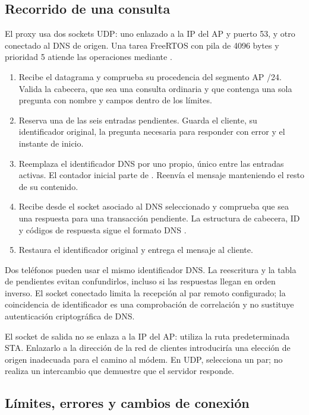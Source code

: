 \documentclass[11pt,a4paper]{article}
\newcommand{\code}[1]{\texttt{\detokenize{#1}}}
\begin{document}
\subsection{Recorrido de una consulta}

El proxy usa dos sockets UDP: uno enlazado a la IP del AP y puerto 53,
y otro conectado al DNS de origen. Una tarea FreeRTOS con pila de
4096 bytes y prioridad 5 atiende las operaciones mediante \code{select()}.

\begin{enumerate}
  \item Recibe el datagrama y comprueba su procedencia del segmento AP /24.
  Valida la cabecera, que sea una consulta ordinaria y que contenga una
  sola pregunta con nombre y campos dentro de los límites.
  \item Reserva una de las seis entradas pendientes. Guarda el cliente,
  su identificador original, la pregunta necesaria para responder con error
  y el instante de inicio.
  \item Reemplaza el identificador DNS por uno propio, único entre las
  entradas activas. El contador inicial parte de \code{esp_random()}.
  Reenvía el mensaje manteniendo el resto de su contenido.
  \item Recibe desde el socket asociado al DNS seleccionado y comprueba
  que sea una respuesta para una transacción pendiente. La estructura de
  cabecera, ID y códigos de respuesta sigue el formato DNS \cite{dnsrfc}.
  \item Restaura el identificador original y entrega el mensaje al cliente.
\end{enumerate}

Dos teléfonos pueden usar el mismo identificador DNS. La reescritura y
la tabla de pendientes evitan confundirlos, incluso si las respuestas
llegan en orden inverso. El socket conectado limita la recepción al par
remoto configurado; la coincidencia de identificador es una comprobación
de correlación y no sustituye autenticación criptográfica de DNS.

El socket de salida no se enlaza a la IP del AP: utiliza la ruta
predeterminada STA. Enlazarlo a la dirección de la red de clientes
introduciría una elección de origen inadecuada para el camino al módem.
En UDP, \code{connect()} selecciona un par; no realiza un intercambio
que demuestre que el servidor responde.

\subsection{Límites, errores y cambios de conexión}
\end{document}
